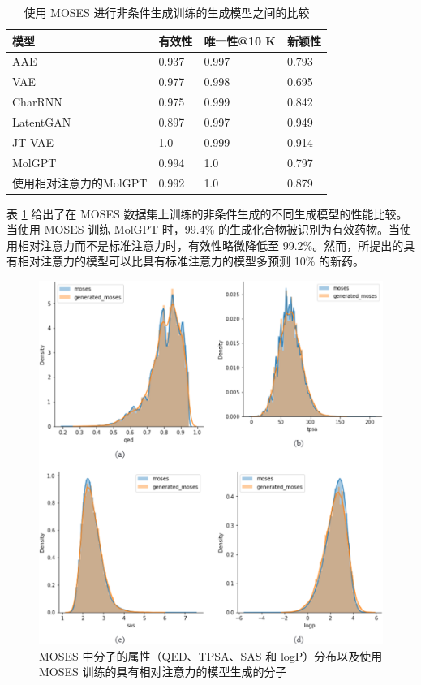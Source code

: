 \begin{translation}
\begin{table}[H]
  \centering
  \caption{使用 MOSES 进行非条件生成训练的生成模型之间的比较}
  \label{tab:1}
  \begin{tabular}{llll}
    \hline 模型      & 有效性   & 唯一性@10 K & 新颖性   \\
    \hline AAE     & 0.937 & 0.997    & 0.793 \\
    VAE            & 0.977 & 0.998    & 0.695 \\
    CharRNN        & 0.975 & 0.999    & 0.842 \\
    LatentGAN      & 0.897 & 0.997    & 0.949 \\
    JT-VAE         & 1.0   & 0.999    & 0.914 \\
    MolGPT         & 0.994 & 1.0      & 0.797 \\
    使用相对注意力的MolGPT & 0.992 & 1.0      & 0.879 \\

    \hline
  \end{tabular}
\end{table}

表 \ref{tab:1} 给出了在 MOSES 数据集上训练的非条件生成的不同生成模型的性能比较。当使用 MOSES 训练 MolGPT 时，99.4\% 的生成化合物被识别为有效药物。当使用相对注意力而不是标准注意力时，有效性略微降低至 99.2\%。然而，所提出的具有相对注意力的模型可以比具有标准注意力的模型多预测 10\% 的新药。

\begin{figure}[H]
  \centering
  \includegraphics[width=\linewidth]{figures/3.png}
  \caption{MOSES 中分子的属性（QED、TPSA、SAS 和 logP）分布以及使用 MOSES 训练的具有相对注意力的模型生成的分子}
  \label{fig:3}
\end{figure}


\end{translation}
